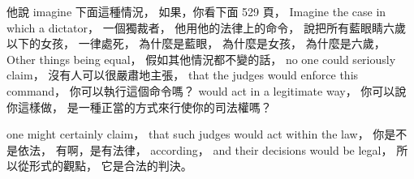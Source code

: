 \hypertarget{w02:cue:1479}{}他說 imagine 下面這種情況，
\hypertarget{w02:cue:1480}{}如果，你看下面 529 頁，
\hypertarget{w02:cue:1481}{}Imagine the case in which a dictator，
\hypertarget{w02:cue:1482}{}一個獨裁者，
\hypertarget{w02:cue:1483}{}他用他的法律上的命令，
\hypertarget{w02:cue:1484}{}說把所有藍眼睛六歲以下的女孩，
\hypertarget{w02:cue:1485}{}一律處死，
\hypertarget{w02:cue:1486}{}為什麼是藍眼，
\hypertarget{w02:cue:1487}{}為什麼是女孩，
\hypertarget{w02:cue:1488}{}為什麼是六歲，
\hypertarget{w02:cue:1489}{}Other things being equal，
\hypertarget{w02:cue:1490}{}假如其他情況都不變的話，
\hypertarget{w02:cue:1491}{}no one could seriously claim，
\hypertarget{w02:cue:1492}{}沒有人可以很嚴肅地主張，
\hypertarget{w02:cue:1493}{}that the judges would enforce this command，
\hypertarget{w02:cue:1494}{}你可以執行這個命令嗎？
\hypertarget{w02:cue:1495}{}would act in a legitimate way，
\hypertarget{w02:cue:1496}{}你可以說你這樣做，
\hypertarget{w02:cue:1497}{}是一種正當的方式來行使你的司法權嗎？

\hypertarget{w02:cue:1498}{}one might certainly claim，
\hypertarget{w02:cue:1499}{}that such judges would act within the law，
\hypertarget{w02:cue:1500}{}你是不是依法，
\hypertarget{w02:cue:1501}{}有啊，是有法律，
\hypertarget{w02:cue:1502}{}according，
\hypertarget{w02:cue:1503}{}and their decisions would be legal，
\hypertarget{w02:cue:1504}{}所以從形式的觀點，
\hypertarget{w02:cue:1505}{}它是合法的判決。

